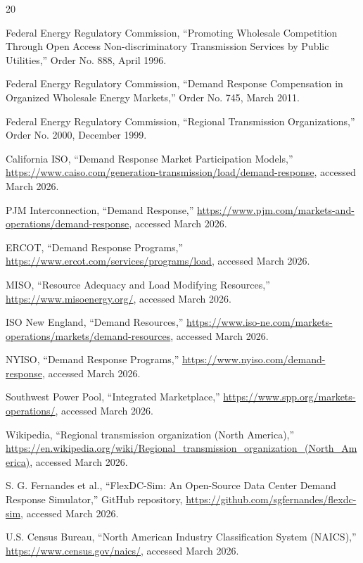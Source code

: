 \documentclass[12pt]{article}
\begin{document}
\begin{thebibliography}{20}

 Federal Energy Regulatory Commission, ``Promoting Wholesale Competition Through Open Access Non-discriminatory Transmission Services by Public Utilities,'' Order No. 888, April 1996.

 Federal Energy Regulatory Commission, ``Demand Response Compensation in Organized Wholesale Energy Markets,'' Order No. 745, March 2011.

 Federal Energy Regulatory Commission, ``Regional Transmission Organizations,'' Order No. 2000, December 1999.

 California ISO, ``Demand Response Market Participation Models,'' \url{https://www.caiso.com/generation-transmission/load/demand-response}, accessed March 2026.

 PJM Interconnection, ``Demand Response,'' \url{https://www.pjm.com/markets-and-operations/demand-response}, accessed March 2026.

 ERCOT, ``Demand Response Programs,'' \url{https://www.ercot.com/services/programs/load}, accessed March 2026.

 MISO, ``Resource Adequacy and Load Modifying Resources,'' \url{https://www.misoenergy.org/}, accessed March 2026.

 ISO New England, ``Demand Resources,'' \url{https://www.iso-ne.com/markets-operations/markets/demand-resources}, accessed March 2026.

 NYISO, ``Demand Response Programs,'' \url{https://www.nyiso.com/demand-response}, accessed March 2026.

 Southwest Power Pool, ``Integrated Marketplace,'' \url{https://www.spp.org/markets-operations/}, accessed March 2026.

 Wikipedia, ``Regional transmission organization (North America),'' \url{https://en.wikipedia.org/wiki/Regional_transmission_organization_(North_America)}, accessed March 2026.

 S. G. Fernandes et al., ``FlexDC-Sim: An Open-Source Data Center Demand Response Simulator,'' GitHub repository, \url{https://github.com/sgfernandes/flexdc-sim}, accessed March 2026.

 U.S. Census Bureau, ``North American Industry Classification System (NAICS),'' \url{https://www.census.gov/naics/}, accessed March 2026.

\end{thebibliography}
\end{document}
